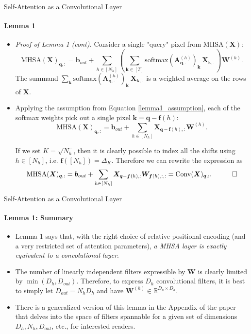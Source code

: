 \documentclass[9pt]{beamer}
\newcommand{\bb}{\mathbb}
\newcommand{\mb}{\bm}
\begin{document}
\newcommand{\row}[1]{_{#1,:}}
\begin{frame}{Self-Attention as a Convolutional Layer}
\framesubtitle{Lemma 1}
\begin{itemize}
\item \textit{Proof of Lemma 1 (cont).} Consider a single "query" pixel from $\mathrm{MHSA}(\bm X)$:
\begin{equation}
    \mathrm{MHSA}(\mb X)\row {\mb q} = \mb b_{out} + 
        \sum_{h\in[N_h]} \left( \sum_{\mb k\in [T]} 
            \mathrm{softmax}(\mb A^{(h)}\row {\mb q})_{\mb k}\ \mb X\row{\mb k} 
        \right) \mb W^{(h)} .
\end{equation}
The summand $\sum_{\mb k} \mathrm{softmax}(\mb A^{(h)}\row {\mb q})_{\mb k}\ \mb X\row{\mb k}$ is a weighted average on the rows of $\bm X$. 

\item Applying the assumption from Equation \eqref{lemma1_assumption}, each of the softmax weights pick out a single pixel $\bm k = \bm q - \bm f(h)$:
\begin{equation}
    \mathrm{MHSA}(\mb X)\row {\mb q} = \mb b_{out} + 
        \sum_{h\in[N_h]}  \mb X\row{\mb q - \mb f(h)} \mb W^{(h)} .
\end{equation}

If we set $K=\sqrt{N_h}$, then it is clearly possible to index all the shifts using $h\in[N_h]$, i.e. $\bm f([N_h]) = \Delta_K$. Therefore we can rewrite the expression as
\begin{equation}
    \mathrm{MHSA}(\mb X)\row {\mb q} = \mb b_{out} + 
        \sum_{h\in[N_h]}  \mb X\row{\mb q - \mb f(h)} \mb W_{\mb f(h), :, :} 
        = \mathrm{Conv}(\mb X)\row{\mb q}. 
    \quad\qed
\end{equation}
\end{itemize}
\end{frame}


\begin{frame}{Self-Attention as a Convolutional Layer}
\framesubtitle{Lemma 1: Summary}
\begin{itemize}
\item Lemma 1 says that, with the right choice of relative positional encoding (and a very restricted set of attention parameters), {\em a MHSA layer is exactly equivalent to a convolutional layer}.

\vspace{.1in}
\item The number of linearly independent filters expressible by $\bm W$ is clearly limited by $\min(D_h, D_{out})$. Therefore, to express $D_h$ convolutional filters, it is best to simply let $D_{out} = N_hD_h$ and have $\bm W^{(h)}\in\bb R^{D_h\times D_h}$. 

\vspace{.1in}
\item There is a generalized version of this lemma in the Appendix of the paper that delves into the space of filters spannable for a given set of dimensions $D_h, N_h, D_{out}$, etc., for interested readers.
\end{itemize}
\end{frame}
\end{document}
